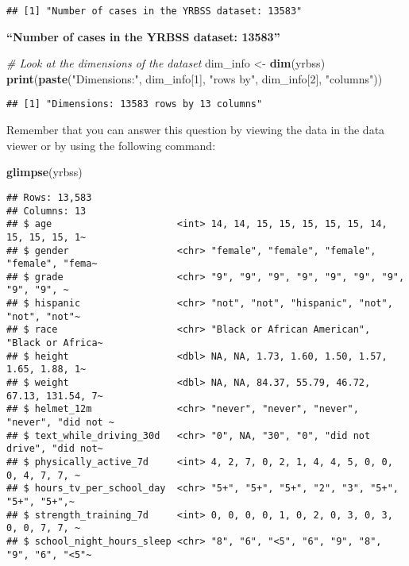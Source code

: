 \documentclass[
]{article}
\newenvironment{Shaded}{\begin{snugshade}}{\end{snugshade}}
\newcommand{\CommentTok}[1]{\textcolor[rgb]{0.56,0.35,0.01}{\textit{#1}}}
\newcommand{\DecValTok}[1]{\textcolor[rgb]{0.00,0.00,0.81}{#1}}
\newcommand{\FunctionTok}[1]{\textcolor[rgb]{0.13,0.29,0.53}{\textbf{#1}}}
\newcommand{\NormalTok}[1]{#1}
\newcommand{\OtherTok}[1]{\textcolor[rgb]{0.56,0.35,0.01}{#1}}
\newcommand{\StringTok}[1]{\textcolor[rgb]{0.31,0.60,0.02}{#1}}
\begin{document}
\begin{verbatim}
## [1] "Number of cases in the YRBSS dataset: 13583"
\end{verbatim}

\textbf{``Number of cases in the YRBSS dataset: 13583''}

\begin{Shaded}
\begin{Highlighting}[]
\CommentTok{\# Look at the dimensions of the dataset}
\NormalTok{dim\_info }\OtherTok{\textless{}{-}} \FunctionTok{dim}\NormalTok{(yrbss)}
\FunctionTok{print}\NormalTok{(}\FunctionTok{paste}\NormalTok{(}\StringTok{"Dimensions:"}\NormalTok{, dim\_info[}\DecValTok{1}\NormalTok{], }\StringTok{"rows by"}\NormalTok{, dim\_info[}\DecValTok{2}\NormalTok{], }\StringTok{"columns"}\NormalTok{))}
\end{Highlighting}
\end{Shaded}

\begin{verbatim}
## [1] "Dimensions: 13583 rows by 13 columns"
\end{verbatim}

Remember that you can answer this question by viewing the data in the
data viewer or by using the following command:

\begin{Shaded}
\begin{Highlighting}[]
\FunctionTok{glimpse}\NormalTok{(yrbss)}
\end{Highlighting}
\end{Shaded}

\begin{verbatim}
## Rows: 13,583
## Columns: 13
## $ age                      <int> 14, 14, 15, 15, 15, 15, 15, 14, 15, 15, 15, 1~
## $ gender                   <chr> "female", "female", "female", "female", "fema~
## $ grade                    <chr> "9", "9", "9", "9", "9", "9", "9", "9", "9", ~
## $ hispanic                 <chr> "not", "not", "hispanic", "not", "not", "not"~
## $ race                     <chr> "Black or African American", "Black or Africa~
## $ height                   <dbl> NA, NA, 1.73, 1.60, 1.50, 1.57, 1.65, 1.88, 1~
## $ weight                   <dbl> NA, NA, 84.37, 55.79, 46.72, 67.13, 131.54, 7~
## $ helmet_12m               <chr> "never", "never", "never", "never", "did not ~
## $ text_while_driving_30d   <chr> "0", NA, "30", "0", "did not drive", "did not~
## $ physically_active_7d     <int> 4, 2, 7, 0, 2, 1, 4, 4, 5, 0, 0, 0, 4, 7, 7, ~
## $ hours_tv_per_school_day  <chr> "5+", "5+", "5+", "2", "3", "5+", "5+", "5+",~
## $ strength_training_7d     <int> 0, 0, 0, 0, 1, 0, 2, 0, 3, 0, 3, 0, 0, 7, 7, ~
## $ school_night_hours_sleep <chr> "8", "6", "<5", "6", "9", "8", "9", "6", "<5"~
\end{verbatim}
\end{document}
